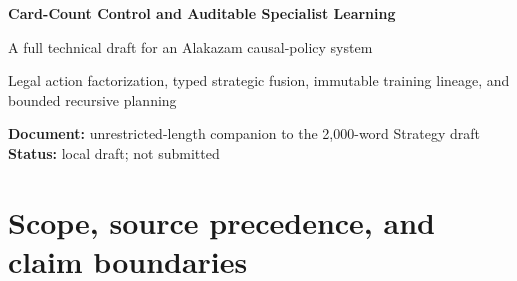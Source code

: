 \documentclass[10pt]{article}
\begin{document}
{\color{ink}\LARGE\bfseries Card-Count Control and Auditable Specialist Learning\par}
\vspace{0.2em}
{\Large A full technical draft for an Alakazam causal-policy system\par}
\vspace{0.35em}
{\large Legal action factorization, typed strategic fusion, immutable training lineage, and bounded recursive planning\par}
\vspace{0.5em}
{\small\textbf{Document:} unrestricted-length companion to the 2,000-word Strategy draft \quad \textbf{Status:} local draft; not submitted}

\begin{abstract}
This report documents a Pok\'emon TCG agent built around a causal Transformer policy/value model, structured legal-action decoding, typed strategic heads, bounded decision fusion, optional causal matchup routing, and a receipt-backed specialist training loop. The current owner-authorized development program is an Alakazam refresh, revision r175, with an exact 60-card list and an 8,196-game iteration contract. Its training runtime can use a lightweight Recursive Turn Planner (RTP) sidecar; the frozen contest-style package remains a policy-only greedy controller because its package does not include the sidecar checkpoint. We keep those surfaces separate throughout.

The report also separates four kinds of evidence that are often conflated: controlled historical gates, descriptive downloaded replay samples, current r175 integration receipts, and features that are merely configured or proposed. Historical Alakazam evidence includes a 4,250-game balanced formal test that failed the system's strict terminal criterion despite passing a separate 1,000-game control. The current r175 program has collection-wiring evidence but no completed formal gate or locally validated Kaggle outcome. This is therefore a system and methodology claim, not a leaderboard or planner-strength claim. Its central thesis is that strategic learning becomes more reliable when legality, causal information, auxiliary supervision, route influence, data identity, and failed experiments are all explicit and inspectable.
\end{abstract}

\tableofcontents

\section{Scope, source precedence, and claim boundaries}
\end{document}
